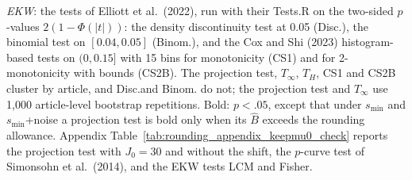 \begin{table}[htbp]
\begin{minipage}{\linewidth}
\textit{EKW}: the tests of Elliott et al.\ (2022), run with their Tests.R on the two-sided $p$-values $2(1-\Phi(|t|))$: the density discontinuity test at 0.05 (Disc.), the binomial test on $[0.04,0.05]$ (Binom.), and the Cox and Shi (2023) histogram-based tests on $(0,0.15]$ with 15 bins for monotonicity (CS1) and for 2-monotonicity with bounds (CS2B).
The projection test, $T_\infty$, $T_H$, CS1 and CS2B cluster by article, and Disc.\@ and Binom. do not; the projection test and $T_\infty$ use 1,000 article-level bootstrap repetitions.
Bold: $p<.05$, except that under $s_{\min}$ and $s_{\min}$+noise a projection test is bold only when its $\widehat{B}$ exceeds the rounding allowance.
Appendix Table~\ref{tab:rounding_appendix_keepmu0_check} reports the projection test with $J_0=30$ and without the shift, the $p$-curve test of Simonsohn et al.\ (2014), and the EKW tests LCM and Fisher.
\end{minipage}
\end{table}
